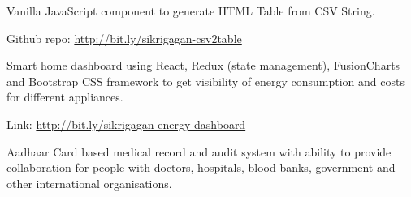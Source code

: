 \documentclass[]{gagan-resume}
\begin{document}
\begin{minipage}[t]{0.65\textwidth}



\vspace{\topsep}
\vspace{\topsep}
\vspace{\topsep}
\vspace{\topsep}




\vspace{\topsep}
\begin{tightemize}
\item Vanilla JavaScript component to generate HTML Table from CSV String.
\item Github repo: \href{http://bit.ly/sikrigagan-csv2table}{http://bit.ly/sikrigagan-csv2table}
\end{tightemize}
\sectionsep

\vspace{\topsep}
\begin{tightemize}
\item Smart home dashboard using React, Redux (state management), FusionCharts and Bootstrap CSS framework to get visibility of energy consumption and costs for different appliances.
\item Link: \href{http://bit.ly/sikrigagan-energy-dashboard}{http://bit.ly/sikrigagan-energy-dashboard}
\end{tightemize}
\sectionsep

\vspace{\topsep}
\begin{tightemize}
\item Aadhaar Card based medical record and audit system with ability to provide collaboration for people with doctors, hospitals, blood banks, government and other international organisations.
\end{tightemize}
\sectionsep



\end{minipage}
\end{document}
